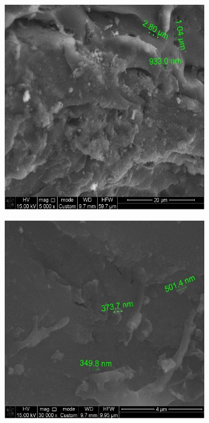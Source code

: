 \begin{figure}[H]
	\centering
	\includegraphics[width=0.8\textwidth]{media/chem2/image16}
	\caption*{}
\end{figure}

\begin{figure}[H]
	\centering
	\includegraphics[width=0.8\textwidth]{media/chem2/image17}
	\caption*{}
\end{figure}

